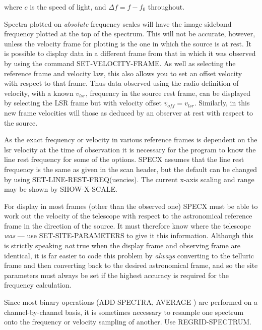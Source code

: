 \documentclass[11pt,twoside]{report}
\begin{document}
where $c$ is the speed of light, and $\Delta f = f-f_0$ throughout.

Spectra plotted on {\em absolute} frequency scales will have the image sideband
frequency plotted at the top of the spectrum. 
This will not be accurate, however, unless the velocity frame for plotting is
the one in which the source is at rest. It is possible to display data in a
different frame from that in which it was observed by using the command
SET-VELOCITY-FRAME. As well as selecting the
reference frame and velocity law, this also allows you to set an offset
velocity with respect to that frame. Thus data observed using the radio
definition of velocity, with a known $v_{lsr}$, frequency in the source rest
frame, can be displayed by selecting the LSR frame but with velocity offset
$v_{off}=v_{lsr}$. Similarly, in this new frame velocities will those as
deduced by an observer at rest with respect to the source. 

As the exact frequency or velocity in various reference frames is dependent on
the lsr velocity at the time of observation it is necessary for the program to
know the line rest frequency for some of the options. SPECX assumes that the
line rest frequency is the same as given in the scan header, but
the default can be changed by using SET-LINE-REST-FREQ(uencies). The current
x-axis scaling and range may be shown by SHOW-X-SCALE. 

For display in most frames (other than the observed one) SPECX must be able to
work out the velocity of the telescope with respect to the astronomical
reference frame  in the direction of the
source. It must therefore know where the telescope  {\em was}
--- use SET-SITE-PARAMETERS to give it this information. Although this is
strictly speaking {\em not} true when the display frame and observing frame
are identical, it is far easier to code this problem by {\em always} converting
to the telluric frame and then converting back to the desired astronomical frame,
and so the site parameters must always be set if the highest accuracy is
required for the frequency calculation.

Since most binary operations (ADD-SPECTRA, AVERAGE \etc) are performed on a
 channel-by-channel
basis, it is sometimes necessary to resample one spectrum  onto the frequency or velocity sampling of
another. Use REGRID-SPECTRUM. 
\end{document}
